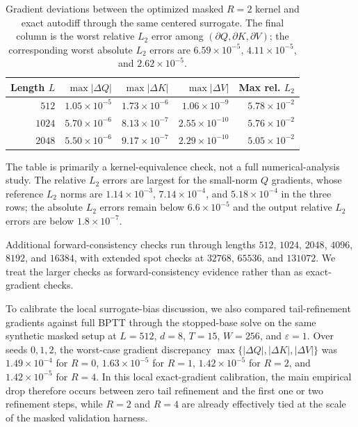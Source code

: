 \begin{table}[h]
    \centering
    \begin{tabular}{@{}rrrrr@{}}
        \toprule
        Length $L$ & $\max |\Delta Q|$ & $\max |\Delta K|$ & $\max |\Delta V|$ & Max rel. $L_2$ \\
        \midrule
        $512$ & $1.05 \times 10^{-5}$ & $1.73 \times 10^{-6}$ & $1.06 \times 10^{-9}$ & $5.78 \times 10^{-2}$ \\
        $1024$ & $5.70 \times 10^{-6}$ & $8.13 \times 10^{-7}$ & $2.55 \times 10^{-10}$ & $5.76 \times 10^{-2}$ \\
        $2048$ & $5.50 \times 10^{-6}$ & $9.17 \times 10^{-7}$ & $2.29 \times 10^{-10}$ & $5.05 \times 10^{-2}$ \\
        \bottomrule
    \end{tabular}
    \caption{Gradient deviations between the optimized masked $R=2$ kernel and exact autodiff through the same centered surrogate. The final column is the worst relative $L_2$ error among $(\partial Q,\partial K,\partial V)$; the corresponding worst absolute $L_2$ errors are $6.59\times10^{-5}$, $4.11\times10^{-5}$, and $2.62\times10^{-5}$.}
    \label{tab:exactness_unified}
\end{table}

The table is primarily a kernel-equivalence check, not a full numerical-analysis study. The relative $L_2$ errors are largest for the small-norm $Q$ gradients, whose reference $L_2$ norms are $1.14\times10^{-3}$, $7.14\times10^{-4}$, and $5.18\times10^{-4}$ in the three rows; the absolute $L_2$ errors remain below $6.6\times10^{-5}$ and the output relative $L_2$ errors are below $1.8\times10^{-7}$.

Additional forward-consistency checks run through lengths $512$, $1024$, $2048$, $4096$, $8192$, and $16384$, with extended spot checks at $32768$, $65536$, and $131072$. We treat the larger checks as forward-consistency evidence rather than as exact-gradient checks.

To calibrate the local surrogate-bias discussion, we also compared tail-refinement gradients against full BPTT through the stopped-base solve on the same synthetic masked setup at $L=512$, $d=8$, $T=15$, $W=256$, and $\varepsilon=1$. Over seeds $0,1,2$, the worst-case gradient discrepancy $\max\{|\Delta Q|,|\Delta K|,|\Delta V|\}$ was $1.49\times 10^{-4}$ for $R=0$, $1.63\times 10^{-5}$ for $R=1$, $1.42\times 10^{-5}$ for $R=2$, and $1.42\times 10^{-5}$ for $R=4$. In this local exact-gradient calibration, the main empirical drop therefore occurs between zero tail refinement and the first one or two refinement steps, while $R=2$ and $R=4$ are already effectively tied at the scale of the masked validation harness.

